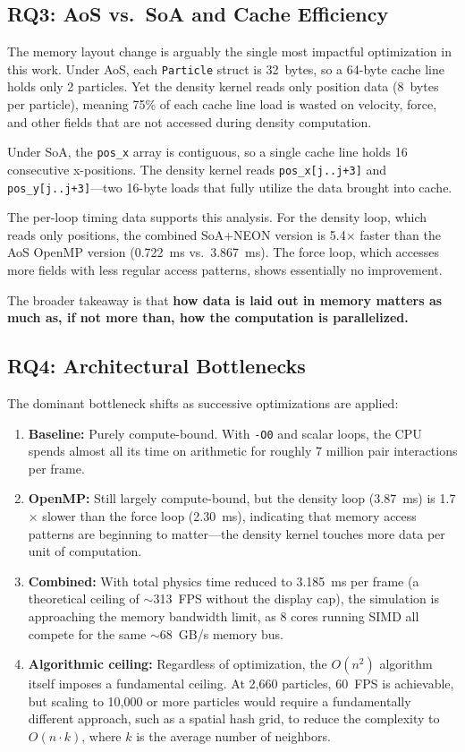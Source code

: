 \documentclass[12pt, a4paper]{article}
\begin{document}
\subsection{RQ3: AoS vs.\ SoA and Cache Efficiency}
The memory layout change is arguably the single most impactful optimization in this work. Under AoS, each \texttt{Particle} struct is 32~bytes, so a 64-byte cache line holds only 2 particles. Yet the density kernel reads only position data (8~bytes per particle), meaning 75\% of each cache line load is wasted on velocity, force, and other fields that are not accessed during density computation.

Under SoA, the \texttt{pos\_x} array is contiguous, so a single cache line holds 16 consecutive x-positions. The density kernel reads \texttt{pos\_x[j..j+3]} and \texttt{pos\_y[j..j+3]}---two 16-byte loads that fully utilize the data brought into cache.

The per-loop timing data supports this analysis. For the density loop, which reads only positions, the combined SoA+NEON version is 5.4$\times$ faster than the AoS OpenMP version (0.722~ms vs.\ 3.867~ms). The force loop, which accesses more fields with less regular access patterns, shows essentially no improvement.

The broader takeaway is that \textbf{how data is laid out in memory matters as much as, if not more than, how the computation is parallelized.}

\subsection{RQ4: Architectural Bottlenecks}
The dominant bottleneck shifts as successive optimizations are applied:
\begin{enumerate}
    \item \textbf{Baseline:} Purely compute-bound. With \texttt{-O0} and scalar loops, the CPU spends almost all its time on arithmetic for roughly 7 million pair interactions per frame.
    \item \textbf{OpenMP:} Still largely compute-bound, but the density loop (3.87~ms) is 1.7$\times$ slower than the force loop (2.30~ms), indicating that memory access patterns are beginning to matter---the density kernel touches more data per unit of computation.
    \item \textbf{Combined:} With total physics time reduced to 3.185~ms per frame (a theoretical ceiling of $\sim$313~FPS without the display cap), the simulation is approaching the memory bandwidth limit, as 8 cores running SIMD all compete for the same $\sim$68~GB/s memory bus.
    \item \textbf{Algorithmic ceiling:} Regardless of optimization, the $O(n^2)$ algorithm itself imposes a fundamental ceiling. At 2,660 particles, 60~FPS is achievable, but scaling to 10,000 or more particles would require a fundamentally different approach, such as a spatial hash grid, to reduce the complexity to $O(n \cdot k)$, where $k$ is the average number of neighbors.
\end{enumerate}
\end{document}

